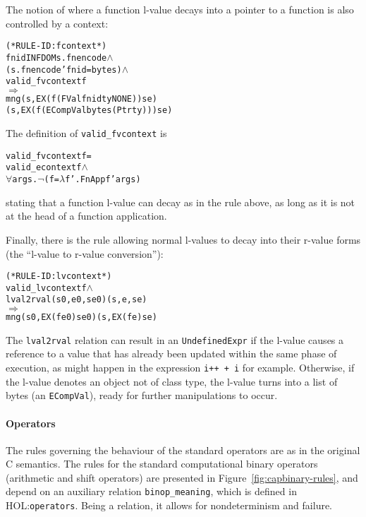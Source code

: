 \documentclass[11pt]{article}
\newcommand{\HOLfile}[1]{HOL:\texttt{#1}}
\begin{document}
The notion of where a function l-value decays into a pointer to a
function is also controlled by a context:
%
\begin{alltt}
(* RULE-ID: fcontext *)
     fnid IN FDOM s.fnencode \(\land\)
     (s.fnencode ' fnid = bytes) \(\land\)
     valid_fvcontext f
   \(\Rightarrow\)
     mng (s, EX (f (FVal fnid ty NONE)) se)
         (s, EX (f (ECompVal bytes (Ptr ty))) se)
\end{alltt}
The definition of \texttt{valid_fvcontext} is
\begin{alltt}
   valid_fvcontext f =
      valid_econtext f \(\land\)
      \(\forall\)args. \(\neg\)(f = \(\lambda\)f'. FnApp f' args)
\end{alltt}
stating that a function l-value can decay as in the rule above, as
long as it is not at the head of a function application.

%
%
Finally, there is the rule allowing normal l-values to decay into
their r-value forms (the ``l-value to r-value conversion''):
%
\begin{alltt}
(* RULE-ID: lvcontext *)
     valid_lvcontext f \(\land\)
     lval2rval (s0,e0,se0) (s,e,se)
   \(\Rightarrow\)
     mng (s0, EX (f e0) se0) (s, EX (f e) se)
\end{alltt}
The \texttt{lval2rval} relation can result in an
\texttt{UndefinedExpr} if the l-value causes a reference to a value
that has already been updated within the same phase of execution, as
might happen in the expression \texttt{i++ + i} for example.
Otherwise, if the l-value denotes an object not of class type, the
l-value turns into a list of bytes (an \texttt{ECompVal}), ready for
further manipulations to occur.

\paragraph{Operators} The rules governing the behaviour of the
standard operators are as in the original C semantics.  The rules for
the standard computational binary operators (arithmetic and shift
operators) are presented in Figure~\ref{fig:capbinary-rules}, and
depend on an auxiliary relation \texttt{binop_meaning}, which is
defined in \HOLfile{operators}.  Being a relation, it allows for
nondeterminism and failure.
\end{document}
